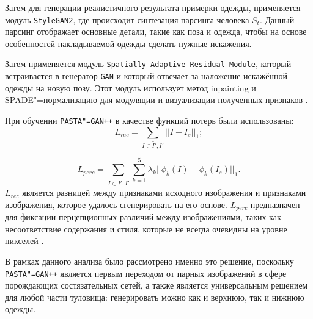 Затем для генерации реалистичного результата примерки одежды, применяется модуль \texttt{StyleGAN2}, где происходит синтезация парсинга человека $S_t$. Данный парсинг отображает основные детали, такие как поза и одежда, чтобы на основе особенностей накладываемой одежды сделать нужные искажения.

Затем применяется модуль \texttt{Spatially-Adaptive Residual Module}, который встраивается в генератор \texttt{GAN} и который отвечает за наложение искажённой одежды на новую позу. Этот модуль использует метод inpainting и SPADE"=нормализацию для модуляции и визуализации полученных признаков \cite{pasta_gan} \cite{spade}.

При обучении \texttt{PASTA"=GAN++} в качестве функций потерь были использованы:
\begin{equation}
    L_{rec} = \sum_{I \in{\tilde{I'}, I'}}||I - I_s||_1;
\end{equation}

\begin{equation}
    L_{perc} = \sum_{I \in{\tilde{I'}, I'}}\sum_{k=1}^5 \lambda_k||\phi_k(I) - \phi_k(I_s)||_1.
\end{equation}
$L_{rec}$ является разницей между признаками исходного изображения и признаками изображения, которое удалось сгенерировать на его основе. $L_{perc}$ предназначен для фиксации перцепционных различий между изображениями, таких как несоответствие содержания и стиля, которые не всегда очевидны на уровне пикселей \cite{pasta_gan}.

В рамках данного анализа было рассмотрено именно это решение, поскольку \texttt{PASTA"=GAN++} является первым переходом от парных изображений в сфере порождающих состязательных сетей, а также является универсальным решением для любой части туловища: генерировать можно как и верхнюю, так и нижнюю одежды.